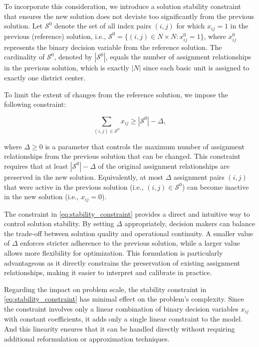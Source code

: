 \documentclass[preprint,12pt,authoryear]{elsarticle}
\begin{document}
To incorporate this consideration, we introduce a solution stability constraint that ensures the new solution does not deviate too significantly from the previous solution. Let $\mathcal{S}^0$ denote the set of all index pairs $(i,j)$ for which $x_{ij} = 1$ in the previous (reference) solution, i.e., $\mathcal{S}^0 = \{(i,j) \in N \times N : x_{ij}^0 = 1\}$, where $x_{ij}^0$ represents the binary decision variable from the reference solution. The cardinality of $\mathcal{S}^0$, denoted by $|\mathcal{S}^0|$, equals the number of assignment relationships in the previous solution, which is exactly $|N|$ since each basic unit is assigned to exactly one district center.

To limit the extent of changes from the reference solution, we impose the following constraint:

\begin{equation}
\sum_{(i,j) \in \mathcal{S}^0} x_{ij} \geqslant |\mathcal{S}^0| - \Delta, \label{eq:stability_constraint}
\end{equation}

where $\Delta \geqslant 0$ is a parameter that controls the maximum number of assignment relationships from the previous solution that can be changed. This constraint requires that at least $|\mathcal{S}^0| - \Delta$ of the original assignment relationships are preserved in the new solution. Equivalently, at most $\Delta$ assignment pairs $(i,j)$ that were active in the previous solution (i.e., $(i,j) \in \mathcal{S}^0$) can become inactive in the new solution (i.e., $x_{ij} = 0$).

The constraint in \eqref{eq:stability_constraint} provides a direct and intuitive way to control solution stability. By setting $\Delta$ appropriately, decision makers can balance the trade-off between solution quality and operational continuity. A smaller value of $\Delta$ enforces stricter adherence to the previous solution, while a larger value allows more flexibility for optimization. This formulation is particularly advantageous as it directly constrains the preservation of existing assignment relationships, making it easier to interpret and calibrate in practice.

Regarding the impact on problem scale, the stability constraint in \eqref{eq:stability_constraint} has minimal effect on the problem's complexity. Since the constraint involves only a linear combination of binary decision variables $x_{ij}$ with constant coefficients, it adds only a single linear constraint to the model. And this linearity ensures that it can be handled directly without requiring additional reformulation or approximation techniques.
\end{document}
